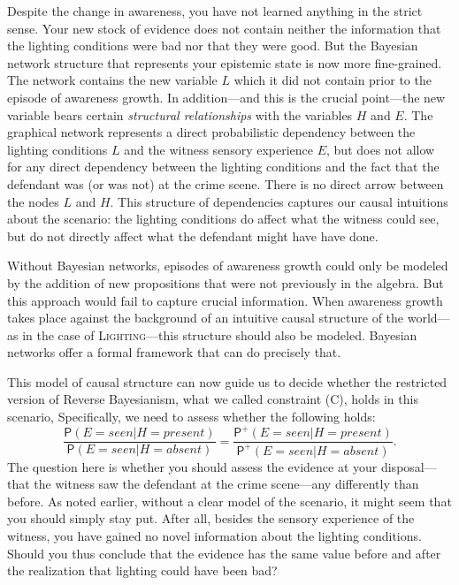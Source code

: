 \documentclass[
  11pt,
  dvipsnames,enabledeprecatedfontcommands]{scrartcl}
\newcommand{\pr}[1]{\ensuremath{\mathsf{P}(#1)}}
\newcommand{\ppr}[2]{\ensuremath{\mathsf{P}^{#1}(#2)}}
\begin{document}
Despite the change in awareness, you have not learned anything in the
strict sense. Your new stock of evidence does not contain neither the
information that the lighting conditions were bad nor that they were
good. But the Bayesian network structure that represents your epistemic
state is now more fine-grained. The network contains the new variable
\(L\) which it did not contain prior to the episode of awareness growth.
In addition---and this is the crucial point---the new variable bears
certain \emph{structural relationships} with the variables \(H\) and
\(E\). The graphical network represents a direct probabilistic
dependency between the lighting conditions \(L\) and the witness sensory
experience \(E\), but does not allow for any direct dependency between
the lighting conditions and the fact that the defendant was (or was not)
at the crime scene. There is no direct arrow between the nodes \(L\) and
\(H\). This structure of dependencies captures our causal intuitions
about the scenario: the lighting conditions do affect what the witness
could see, but do not directly affect what the defendant might have have
done.

Without Bayesian networks, episodes of awareness growth could only be
modeled by the addition of new propositions that were not previously in
the algebra. But this approach would fail to capture crucial
information. When awareness growth takes place against the background of
an intuitive causal structure of the world---as in the case of
\textsc{Lighting}---this structure should also be modeled. Bayesian
networks offer a formal framework that can do precisely that.

This model of causal structure can now guide us to decide whether the
restricted version of Reverse Bayesianism, what we called constraint
(C), holds in this scenario, Specifically, we need to assess whether the
following holds:
\[\frac{\pr{E=seen \vert H=present}}{\pr{E=seen \vert H=absent}}= \frac{\ppr{+}{E=seen \vert H=present}}{\ppr{+}{E=seen \vert H=absent}}.\]
The question here is whether you should assess the evidence at your
disposal---that the witness saw the defendant at the crime scene---any
differently than before. As noted earlier, without a clear model of the
scenario, it might seem that you should simply stay put. After all,
besides the sensory experience of the witness, you have gained no novel
information about the lighting conditions. Should you thus conclude that
the evidence has the same value before and after the realization that
lighting could have been bad?
\end{document}
